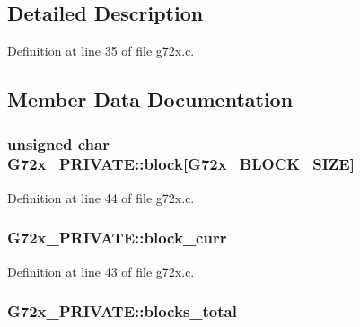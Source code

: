 \subsection{Detailed Description}


Definition at line 35 of file g72x.\+c.



\subsection{Member Data Documentation}
\subsubsection[{\texorpdfstring{block}{block}}]{\setlength{\rightskip}{0pt plus 5cm}unsigned char G72x\+\_\+\+P\+R\+I\+V\+A\+T\+E\+::block\mbox{[}{\bf G72x\+\_\+\+B\+L\+O\+C\+K\+\_\+\+S\+I\+ZE}\mbox{]}}\hypertarget{struct_g72x___p_r_i_v_a_t_e_a19e547b1d7c570c5b3b0cde2dd605172}{}\label{struct_g72x___p_r_i_v_a_t_e_a19e547b1d7c570c5b3b0cde2dd605172}


Definition at line 44 of file g72x.\+c.

\subsubsection[{\texorpdfstring{block\+\_\+curr}{block_curr}}]{ G72x\+\_\+\+P\+R\+I\+V\+A\+T\+E\+::block\+\_\+curr}\hypertarget{struct_g72x___p_r_i_v_a_t_e_a7ea654b4348cc1652bacbf107921679c}{}\label{struct_g72x___p_r_i_v_a_t_e_a7ea654b4348cc1652bacbf107921679c}


Definition at line 43 of file g72x.\+c.

\subsubsection[{\texorpdfstring{blocks\+\_\+total}{blocks_total}}]{ G72x\+\_\+\+P\+R\+I\+V\+A\+T\+E\+::blocks\+\_\+total}\hypertarget{struct_g72x___p_r_i_v_a_t_e_a4d3d80c9d2c5db28ef600fa7dd654686}{}\label{struct_g72x___p_r_i_v_a_t_e_a4d3d80c9d2c5db28ef600fa7dd654686}


